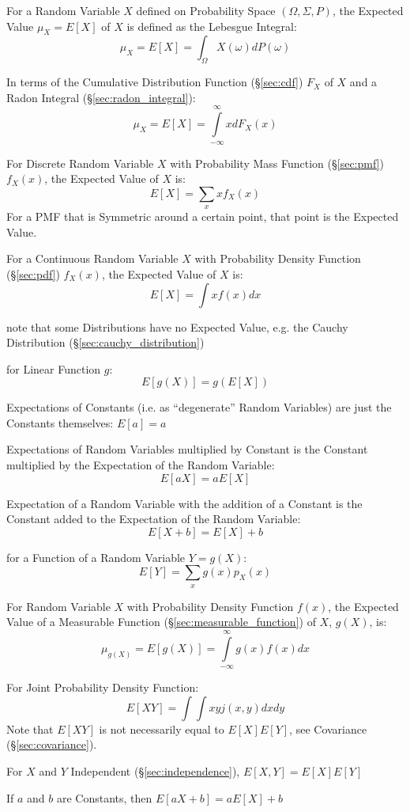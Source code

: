 For a Random Variable $X$ defined on Probability Space $(\Omega,\Sigma,P)$, the
Expected Value $\mu_X = E[X]$ of $X$ is defined as the Lebesgue Integral:
\[
  \mu_X = E[X] = \int_\Omega X(\omega) dP(\omega)
\]

In terms of the Cumulative Distribution Function (\S\ref{sec:cdf}) $F_X$ of $X$
and a Radon Integral (\S\ref{sec:radon_integral}):
\[
  \mu_X = E[X] = \int\limits_{-\infty}^{\infty} x dF_X(x)
\]

For Discrete Random Variable $X$ with Probability Mass Function
(\S\ref{sec:pmf}) $f_X(x)$, the Expected Value of $X$ is:
\[
  E[X] = \sum_x x f_X(x)
\]
For a PMF that is Symmetric around a certain point, that point is the Expected
Value.

For a Continuous Random Variable $X$ with Probability Density Function
(\S\ref{sec:pdf}) $f_X(x)$, the Expected Value of $X$ is:
\[
  E[X] = \int x f(x) dx
\]

note that some Distributions have no Expected Value, e.g. the Cauchy
Distribution (\S\ref{sec:cauchy_distribution})

for Linear Function $g$:
\[
  E[g(X)] = g(E[X])
\]

Expectations of Constants (i.e. as ``degenerate'' Random Variables) are just
the Constants themselves: $E[a] = a$

Expectations of Random Variables multiplied by Constant is the Constant
multiplied by the Expectation of the Random Variable:
\[
  E[aX] = aE[X]
\]

Expectation of a Random Variable with the addition of a Constant is the
Constant added to the Expectation of the Random Variable:
\[
  E[X + b] = E[X] + b
\]

for a Function of a Random Variable $Y = g(X)$:
\[
  E[Y] = \sum_x g(x) p_X(x)
\]

For Random Variable $X$ with Probability Density Function $f(x)$, the
Expected Value of a Measurable Function
(\S\ref{sec:measurable_function}) of $X$, $g(X)$, is:
\[
  \mu_{g(X)} = E[g(X)] = \int\limits_{-\infty}^{\infty} g(x) f(x) dx
\]

For Joint Probability Density Function:
\[
  E[X Y] = \int\int x y j(x,y) dx dy
\]
\fist Note that $E[X Y]$ is not necessarily equal to $E[X] E[Y]$, see Covariance
(\S\ref{sec:covariance}).

For $X$ and $Y$ Independent (\S\ref{sec:independence}), $E[X,Y] = E[X] E[Y]$

If $a$ and $b$ are Constants, then $E[aX + b] = a E[X] + b$

